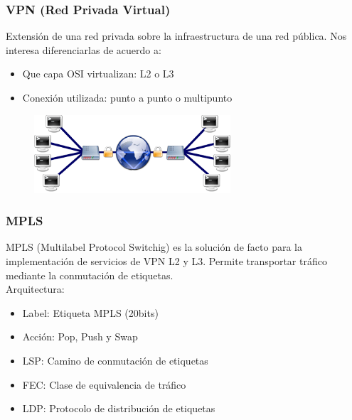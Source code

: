 \documentclass{beamer}
\begin{document}
\begin{frame}
\frametitle{VPN (Red Privada Virtual)} 
Extensión de una red privada sobre la infraestructura de una red pública. Nos interesa diferenciarlas de acuerdo a:
\begin{itemize}
\item Que capa OSI virtualizan: L2 o L3
\item Conexi\'on utilizada: punto a punto o multipunto
\end{itemize}
	
\vspace{0.4cm}
\begin{figure}[H]
\centering
\includegraphics[width=0.65\textwidth]{imagenes/vpn.png}
\end{figure}

\end{frame}

\begin{frame}
\frametitle{MPLS} 

MPLS (Multilabel Protocol Switchig) es la soluci\'on de facto para la implementaci\'on de servicios de VPN L2 y L3. Permite transportar tr\'afico mediante la conmutaci\'on de etiquetas.\\

\vspace{0.4cm}
\pause
Arquitectura:\\

\begin{itemize}
\item Label: Etiqueta MPLS (20bits)
\item Acci\'on: Pop, Push y Swap
\item LSP: Camino de conmutaci\'on de etiquetas
\item FEC: Clase de equivalencia de tr\'afico
\item LDP: Protocolo de distribución de etiquetas
\end{itemize}

\end{frame}
\end{document}
